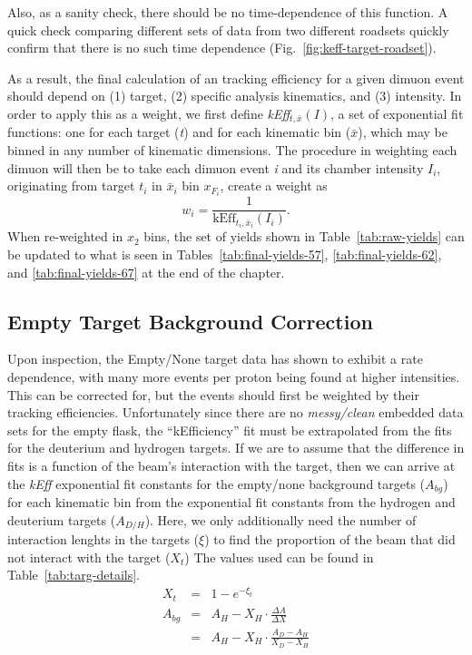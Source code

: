 Also, as a sanity check, there should be no time-dependence of this function. A quick check comparing different sets of data from two different roadsets quickly confirm that there is no such time dependence (Fig.~\ref{fig:keff-target-roadset}).

As a result, the final calculation of an tracking efficiency for a given dimuon event should depend on (1) target, (2) specific analysis kinematics, and (3) intensity. In order to apply this as a weight, we first define \emph{kEff}$_{t, \bar{x}}(I)$, a set of exponential fit functions: one for each target (\emph{t}) and for each kinematic bin ($\bar{x}$), which may be binned in any number of kinematic dimensions. The procedure in weighting each dimuon will then be to take each dimuon event \emph{i} and its chamber intensity $I_i$, originating from target $t_i$ in $\bar{x}_i$ bin $x_{F_i}$, create a weight as
\begin{equation}
w_i = \frac{1}{\text{kEff}_{t_i, \bar{x}_i}(I_i)}.
\end{equation}
When re-weighted in $x_2$ bins, the set of yields shown in Table~\ref{tab:raw-yields} can be updated to what is seen in Tables~\ref{tab:final-yields-57}, \ref{tab:final-yields-62}, and \ref{tab:final-yields-67} at the end of the chapter.

\subsection{ Empty Target Background Correction}\label{sec:bg}

Upon inspection, the Empty/None target data has shown to exhibit a rate dependence, with many more events per proton being found at higher intensities. This can be corrected for, but the events should first be weighted by their tracking efficiencies. Unfortunately since there are no \emph{messy/clean} embedded data sets for the empty flask, the ``kEfficiency'' fit must be extrapolated from the fits for the deuterium and hydrogen targets. If we are to assume that the difference in fits is a function of the beam's interaction with the target, then we can arrive at the \emph{kEff} exponential fit constants for the empty/none background targets ($A_{bg}$) for each kinematic bin from the exponential fit constants from the hydrogen and deuterium targets ($A_{D/H}$). Here, we only additionally need the number of interaction lenghts in the targets ($\xi$) to find the proportion of the beam that did not interact with the target ($X_t$) The values used can be found in Table~\ref{tab:targ-details}.
\begin{eqnarray}
X_t & = & 1 - e^{-\xi_t} \\
A_{bg} & = & A_H - X_H \cdot \frac{\Delta A}{\Delta X} \\
	   & = & A_H - X_H \cdot \frac{A_D - A_H}{X_D - X_H}
\end{eqnarray}

